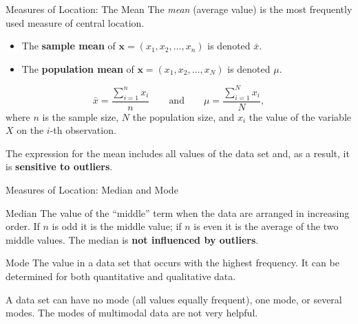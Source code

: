 \documentclass[10pt,aspectratio=169]{beamer}
\begin{document}
\begin{frame}{Measures of Location: The Mean}
  The \emph{mean} (average value) is the most frequently used measure of central
  location.

  \begin{itemize}
    \item The \textbf{sample mean} of $\mathbf{x} = (x_1, x_2, \ldots, x_n)$ is
          denoted $\bar{x}$.
    \item The \textbf{population mean} of
          $\mathbf{x} = (x_1, x_2, \ldots, x_N)$ is denoted $\mu$.
  \end{itemize}

  \[
    \bar{x} = \frac{\sum_{i=1}^{n} x_i}{n}
    \qquad\text{and}\qquad
    \mu = \frac{\sum_{i=1}^{N} x_i}{N},
  \]
  where $n$ is the sample size, $N$ the population size, and $x_i$ the value of
  the variable $X$ on the $i$-th observation.

  \vspace{0.5em}
  The expression for the mean includes all values of the data set and, as a
  result, it is \textbf{sensitive to outliers}.
\end{frame}

\begin{frame}{Measures of Location: Median and Mode}
  \begin{block}{Median}
    The value of the ``middle'' term when the data are arranged in increasing
    order. If $n$ is odd it is the middle value; if $n$ is even it is the average
    of the two middle values. The median is \textbf{not influenced by outliers}.
  \end{block}

  \begin{block}{Mode}
    The value in a data set that occurs with the highest frequency. It can be
    determined for both quantitative and qualitative data.

    A data set can have no mode (all values equally frequent), one mode, or
    several modes. The modes of multimodal data are not very helpful.
  \end{block}
\end{frame}
\end{document}
